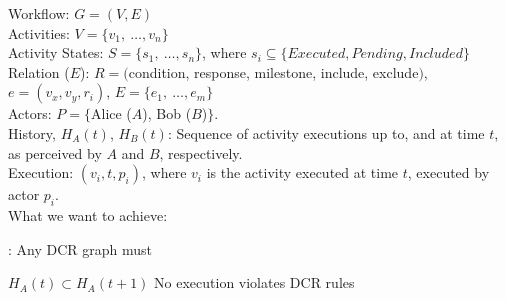 \documentclass{article}
\begin{document}
	\noindent
	Workflow: $G=(V,E)$ \\
	Activities: $V=\{v_1,\ \dots, v_n\}$ \\ %
	Activity States: $S=\{s_1,\ \dots, s_n\}$, where $s_i \subseteq \{Executed, Pending, Included\}$\\
	Relation ($E$): $R=($condition, response, milestone, include, exclude$)$, $e=(v_x, v_y, r_i)$, $E=\{e_1,\ \dots, e_m\}$\\
	Actors: $P =\{$Alice ($A$), Bob ($B$)$\}$.\\
	History, $H_A(t)$, $H_B(t)$: Sequence of activity executions up to, and at time $t$, as perceived by $A$ and $B$, respectively.\\
	Execution: $(v_i, t, p_i)$, where $v_i$ is the activity executed at time $t$, executed by actor $p_i$.\\

	What we want to achieve:
	\begin{description}
		\item[Correctness]: Any DCR graph must 
		\item  
	\end{description}
	$H_A(t) \subset H_A(t+1)$
	No execution violates DCR rules
\end{document}
